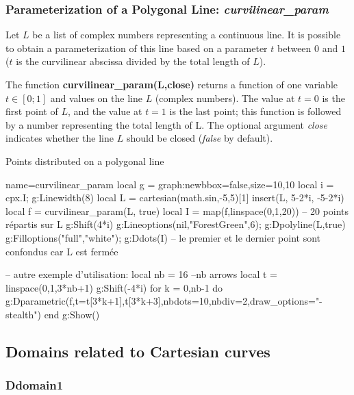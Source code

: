 \subsubsection{Parameterization of a Polygonal Line: \emph{curvilinear\_param}}
Let $L$ be a list of complex numbers representing a continuous \og \fg line. It is possible to obtain a parameterization of this line based on a parameter $t$ between $0$ and $1$ ($t$ is the curvilinear abscissa divided by the total length of $L$).

The function \textbf{curvilinear\_param(L,close)} returns a function of one variable $t\in[0;1]$ and values ​​on the line $L$ (complex numbers). The value at $t=0$ is the first point of $L$, and the value at $t=1$ is the last point; this function is followed by a number representing the total length of L. The optional argument \emph{close} indicates whether the line $L$ should be closed (\emph{false} by default).

\begin{demo}{Points distributed on a polygonal line}
\begin{luadraw}{name=curvilinear_param}
local g = graph:new{bbox=false,size={10,10}}
local i = cpx.I; g:Linewidth(8)
local L = cartesian(math.sin,-5,5)[1]
insert(L, {5-2*i, -5-2*i})
local f = curvilinear_param(L, true)
local I = map(f,linspace(0,1,20)) -- 20 points répartis sur L
g:Shift(4*i)
g:Lineoptions(nil,"ForestGreen",6); g:Dpolyline(L,true)
g:Filloptions("full","white"); g:Ddots(I) -- le premier et le dernier point sont confondus car L est fermée

-- autre exemple d'utilisation:
local nb = 16 --nb arrows
local t = linspace(0,1,3*nb+1)
g:Shift(-4*i)
for k = 0,nb-1 do
    g:Dparametric(f,{t={t[3*k+1],t[3*k+3]},nbdots=10,nbdiv=2,draw_options="-stealth"})
end
g:Show() 
\end{luadraw}
\end{demo}


\subsection{Domains related to Cartesian curves}

\subsubsection{Ddomain1}

